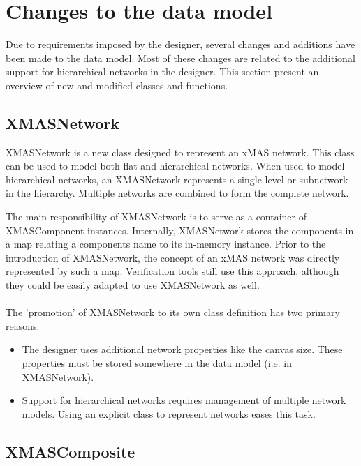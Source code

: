 \section{Changes to the data model}

Due to requirements imposed by the designer, several changes and additions have
been made to the data model. Most of these changes are related to the additional
support for hierarchical networks in the designer. This section present an overview
of new and modified classes and functions.

\subsection{XMASNetwork}

XMASNetwork is a new class designed to represent an xMAS network. This class can be
used to model both flat and hierarchical networks. When used to model hierarchical
networks, an XMASNetwork represents a single level or subnetwork in the hierarchy.
Multiple networks are combined to form the complete network.

The main responsibility of XMASNetwork is to serve as a container of XMASComponent
instances. Internally, XMASNetwork stores the components in a map relating a
components name to its in-memory instance. Prior to the introduction of XMASNetwork,
the concept of an xMAS network was directly represented by such a map. Verification
tools still use this approach, although they could be easily adapted to use
XMASNetwork as well.

\paragraph{}
The 'promotion' of XMASNetwork to its own class definition has two primary reasons:
\begin{itemize}
 \item The designer uses additional network properties like the canvas size. These
 properties must be stored somewhere in the data model (i.e. in XMASNetwork).
 \item Support for hierarchical networks requires management of multiple network
 models. Using an explicit class to represent networks eases this task.
\end{itemize}


\subsection{XMASComposite}

